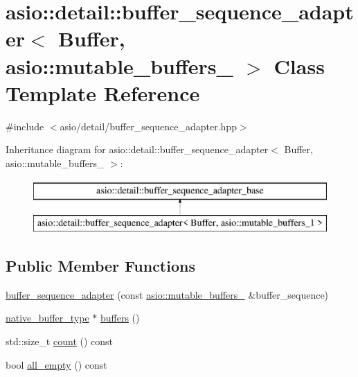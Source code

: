 \hypertarget{classasio_1_1detail_1_1buffer__sequence__adapter_3_01_buffer_00_01asio_1_1mutable__buffers__1_01_4}{}\section{asio\+:\+:detail\+:\+:buffer\+\_\+sequence\+\_\+adapter$<$ Buffer, asio\+:\+:mutable\+\_\+buffers\+\_ $>$ Class Template Reference}
\label{classasio_1_1detail_1_1buffer__sequence__adapter_3_01_buffer_00_01asio_1_1mutable__buffers__1_01_4}


{\ttfamily \#include $<$asio/detail/buffer\+\_\+sequence\+\_\+adapter.\+hpp$>$}

Inheritance diagram for asio\+:\+:detail\+:\+:buffer\+\_\+sequence\+\_\+adapter$<$ Buffer, asio\+:\+:mutable\+\_\+buffers\+\_ $>$\+:\begin{figure}[H]
\begin{center}
\leavevmode
\includegraphics[height=2.000000cm]{classasio_1_1detail_1_1buffer__sequence__adapter_3_01_buffer_00_01asio_1_1mutable__buffers__1_01_4}
\end{center}
\end{figure}
\subsection*{Public Member Functions}
\begin{DoxyCompactItemize}
\item 
\hyperlink{classasio_1_1detail_1_1buffer__sequence__adapter_3_01_buffer_00_01asio_1_1mutable__buffers__1_01_4_ab715e3ff9e43b4182850edd18a0881fb}{buffer\+\_\+sequence\+\_\+adapter} (const \hyperlink{classasio_1_1mutable__buffers__1}{asio\+::mutable\+\_\+buffers\+\_} \&buffer\+\_\+sequence)
\item 
\hyperlink{classasio_1_1detail_1_1buffer__sequence__adapter__base_a91d037bd052777b8df514e6b94ec9e71}{native\+\_\+buffer\+\_\+type} $\ast$ \hyperlink{classasio_1_1detail_1_1buffer__sequence__adapter_3_01_buffer_00_01asio_1_1mutable__buffers__1_01_4_a733a54bcebd97991f3c5c3ae69e04699}{buffers} ()
\item 
std\+::size\+\_\+t \hyperlink{classasio_1_1detail_1_1buffer__sequence__adapter_3_01_buffer_00_01asio_1_1mutable__buffers__1_01_4_a0152edf9af0e26deaec749c36fe577ab}{count} () const 
\item 
bool \hyperlink{classasio_1_1detail_1_1buffer__sequence__adapter_3_01_buffer_00_01asio_1_1mutable__buffers__1_01_4_a7ac1bbac57dbb04eb13bc7a4df5de728}{all\+\_\+empty} () const 
\end{DoxyCompactItemize}
